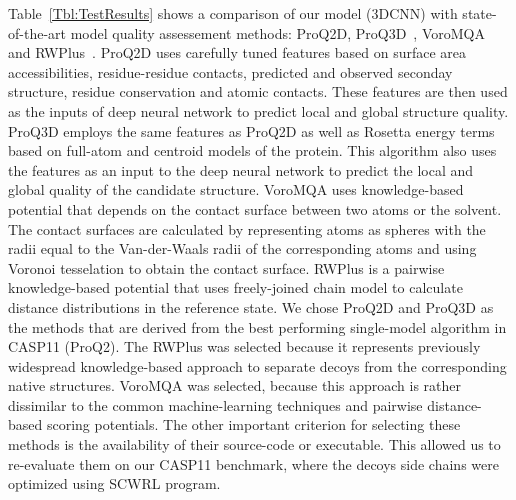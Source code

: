 Table~\ref{Tbl:TestResults} shows a comparison of our model (3DCNN)
with state-of-the-art model quality assessement methods: ProQ2D,
ProQ3D~\cite{uziela2017proq3d}, VoroMQA~\cite{olechnovivc2017voromqa}
and RWPlus~\cite{zhang2010novel}.
ProQ2D uses carefully tuned features based on surface area accessibilities, residue-residue contacts, 
predicted and observed seconday structure, residue conservation and atomic contacts. These features are 
then used as the inputs of deep neural network to predict local and global structure quality. 
ProQ3D employs the same features as ProQ2D as well as Rosetta energy terms based on full-atom and centroid models of the protein. 
This algorithm also uses the features as an input to the deep neural network to predict the 
local and global quality of the candidate structure.
VoroMQA uses knowledge-based potential that depends on the contact surface between two atoms or the solvent. The contact surfaces are calculated 
by representing atoms as spheres with the radii equal to the Van-der-Waals radii of the corresponding atoms and using Voronoi tesselation to obtain 
the contact surface. 
RWPlus is a pairwise knowledge-based potential that uses freely-joined chain model to calculate distance distributions in the reference state.
We chose ProQ2D and ProQ3D as the methods that are derived from the best performing single-model algorithm in CASP11 (ProQ2). The RWPlus 
was selected because it represents previously widespread knowledge-based approach to separate decoys from the corresponding native structures.
VoroMQA was selected, because this approach is rather dissimilar to the common machine-learning techniques and pairwise distance-based scoring potentials.
The other important criterion for selecting these methods is the availability of their source-code or executable. This allowed us to re-evaluate them on 
our CASP11 benchmark, where the decoys side chains were optimized using SCWRL program.




